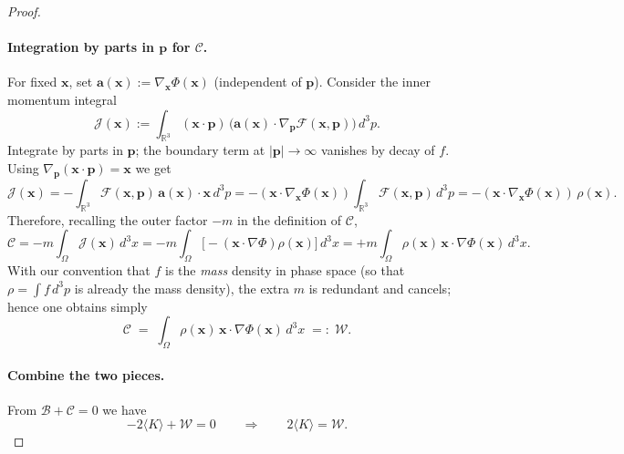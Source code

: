 \documentclass[12pt,a4paper]{article}
\numberwithin{equation}{section}
\begin{document}
\begin{proof}
\paragraph{Integration by parts in \(\mathbf{p}\) for \(\mathscr{C}\).}
For fixed \(\mathbf{x}\), set \(\mathbf{a}(\mathbf{x}):=\nabla_{\mathbf{x}}\Phi(\mathbf{x})\) (independent of \(\mathbf{p}\)). Consider the inner momentum integral
\begin{equation}
\mathscr{J}(\mathbf{x}) := \int_{\mathbb{R}^3} (\mathbf{x}\!\cdot\!\mathbf{p})\,\big(\mathbf{a}(\mathbf{x})\!\cdot\!\nabla_{\mathbf{p}} \mathcal{F}(\mathbf{x},\mathbf{p})\big)\,d^3p.
\end{equation}
Integrate by parts in \(\mathbf{p}\); the boundary term at $|\mathbf{p}|\to\infty$ vanishes by decay of \(f\). Using \(\nabla_{\mathbf{p}}(\mathbf{x}\!\cdot\!\mathbf{p})=\mathbf{x}\) we get
\begin{equation}
\mathscr{J}(\mathbf{x}) = -\int_{\mathbb{R}^3} \mathcal{F}(\mathbf{x},\mathbf{p})\,\mathbf{a}(\mathbf{x})\!\cdot\!\mathbf{x}\,d^3p
= -(\mathbf{x}\!\cdot\!\nabla_{\mathbf{x}}\Phi(\mathbf{x}))\int_{\mathbb{R}^3} \mathcal{F}(\mathbf{x},\mathbf{p})\,d^3p
= -(\mathbf{x}\!\cdot\!\nabla_{\mathbf{x}}\Phi(\mathbf{x}))\,\rho(\mathbf{x}).
\end{equation}
Therefore, recalling the outer factor \(-m\) in the definition of \(\mathscr{C}\),
\begin{equation}
\mathscr{C} = -m\int_{\Omega} \mathscr{J}(\mathbf{x})\,d^3x
= -m\int_{\Omega} \big[-(\mathbf{x}\!\cdot\!\nabla\Phi)\rho(\mathbf{x})\big]\,d^3x
= +m\int_{\Omega} \rho(\mathbf{x})\,\mathbf{x}\!\cdot\!\nabla\Phi(\mathbf{x})\,d^3x.
\end{equation}
With our convention that $f$ is the \emph{mass} density in phase space (so that $\rho=\int f\,d^3p$ is already the mass density), the extra $m$ is redundant and cancels; hence one obtains simply
\begin{equation}
\mathscr{C} \;=\; \int_{\Omega} \rho(\mathbf{x})\,\mathbf{x}\!\cdot\!\nabla\Phi(\mathbf{x})\,d^3x \;=: \; \mathcal{W}.
\end{equation}

\paragraph{Combine the two pieces.}
From \(\mathscr{B}+\mathscr{C}=0\) we have
\begin{equation}
-2\langle {K}\rangle + \mathcal{W} = 0 \qquad\Longrightarrow\qquad 2\langle {K}\rangle = \mathcal{W}.
\label{eq:virial_intermediate}
\end{equation}


\end{proof}
\end{document}
